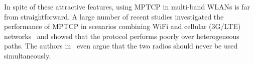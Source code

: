 In spite of these attractive features, using MPTCP in multi-band WLANs
is far from straightforward. A large number of recent studies
investigated the performance of MPTCP in scenarios combining WiFi and
cellular (3G/LTE) networks~\cite{raiciu:nsdi2012,saha:mobiwac2017} and showed that the
protocol performs poorly over heterogeneous paths.
The authors in~\cite{sur:mobicom2017,nguyen:vtc2017} even argue that the two
radios should never be used simultaneously.

